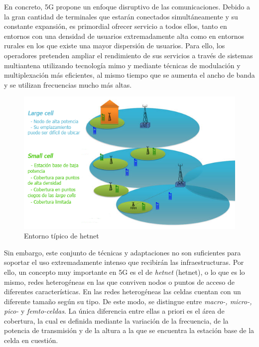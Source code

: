 En concreto, 5G propone un enfoque disruptivo de las comunicaciones. Debido a la gran cantidad de terminales que estarán conectados simultáneamente y su constante expansión, es primordial ofrecer servicio a todos ellos, tanto en entornos con una densidad de usuarios extremadamente alta como en entornos rurales en los que existe una mayor dispersión de usuarios. Para ello, los operadores pretenden ampliar el rendimiento de sus servicios a través de sistemas multiantena utilizando tecnología \ac{mimo} y mediante técnicas de modulación y multiplexación más eficientes, al mismo tiempo que se aumenta el ancho de banda y se utilizan frecuencias mucho más altas.


\begin{figure}[ht]
	\centering
    \includegraphics[width=1\linewidth]{imagenes/hetnet_enviroment.png}
	\caption{Entorno típico de \acs{hetnet} \cite{hetnetexplained}}
	\label{fig:hetnet}
\end{figure}

Sin embargo, este conjunto de técnicas y adaptaciones no son suficientes para soportar el uso extremadamente intenso que recibirán las infraestructuras. Por ello, un concepto muy importante en 5G es el de \textit{\acl{hetnet}} (\acs{hetnet}), o lo que es lo mismo, redes heterogéneas en las que conviven nodos o puntos de acceso de diferentes características. En las redes heterogéneas las celdas cuentan con un diferente tamaño según su tipo. De este modo, se distingue entre \textit{macro-, micro-, pico-} y \textit{femto-celdas}. La única diferencia entre ellas a priori es el área de cobertura, la cual es definida mediante la variación de la frecuencia, de la potencia de transmisión y de la altura a la que se encuentra la estación base de la celda en cuestión.


